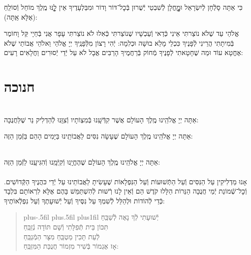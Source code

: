 \documentclass[twoside, openany, parskip=half, 11pt]{book}
\begin{document}
\begin{sometimes}
כִּי אַתָּה סָלְֿחָן לְֿיִשְׂרָאֵל וּמׇׇׇׇׇׇׇׇָחֳלָן לְֿשִׁבְטֵי יְֿשֻׁרוּן בְּֿכׇל־דּוֹר וָדוֹר
וּמִבַּלְעָדֶיךָ אֵין לׇׇׇׇָֽנּוּ מֶֽלֶךְ מוֹחֵל וְֿסוֹלֵֽחַ (אֶלָּא אַֽתָּה):

אֱלֹהַי עַד שֶׁלֹא נוֹצַרתִּי אֵינִי כְּֿדַאי וְֿעַכְשָׁיו שֶׁנוֹצַרתִּי כְּֿאִלוּ לֹא נוֹצַרתִּי עָפָר אֲנִי בְּֿחַיָי קַּל וָחוֹמֶר בְּֿמִיתָתִי הֲרֵינִי לְֿפָּנֶיךָ כִּכְלֵי מָלֵא בוּשָׁה וּכְלִמָה: יְֿהִי רָצוֹן מִלְּֿפָנֶֽיךָ יְיָ אֱלֹהַי וֵאלֹהֵי אֲבוֹתַי שֶׁלֹא אֶחֱטָא עוֹד וּמַה שֶׁחָטָאתִי לְֿפָנֶיךָ מְֿחוֹק בְּֿרַחֲמֶיךָ הָרַבִּים אֲבָל לֹא עַל יְֿדֵי יְֿסוּרִים וַחֲלָאִים רָעִים:

\vfill
\sepline

\chapter[חנוכה]{ חנוכה }
\label{chanukah}

\\
אַתָּה יְיָ אֱלֹהֵֽינוּ מֶֽלֶךְ הָעוֹלָם
אֲשֶׁר קִדְּֿשָֽׁנוּ בְּֿמִצְוֹתָיו וְֿצִוָּֽנוּ לְֿהַדְלִיק נֵר שֶׁלַּחֲנֻכָּה:

אַתָּה יְיָ אֱלֹהֵֽינוּ מֶֽלֶךְ הָעוֹלָם שֶׁעָשָׂה נִסִּים לַאֲבוֹתֵֽינוּ בַּיָּמִים הָהֵם בַּזְּֿמַן הַזֶּה:

\\
אַתָּה יְיָ אֱלֹהֵֽינוּ מֶֽלֶךְ הָעוֹלָם שֶׁהֶחֱיָֽנוּ וְֿקִיְּֿמָֽנוּ וְֿהִגִּיעָֽנוּ לַזְּֿמַן הַזֶּה:\\

\\
אָנוּ מַדְלִיקִין
עַל הַנִּסִּים וְֿעַל הַתְּֿשׁוּעוֹת
וְֿעַל הַנִּפְלָאוֹת
שֶׁעָשִׂיתָ לַאֲבוֹתֵינוּ
עַל יְֿדֵי כּהֲנֶיךָ הַקְּֿדוֹשִׁים.
וְֿכׇל־שְֿׁמוֹנַת יְֿמֵי חֲנֻכָּה
הַנֵּרוֹת הַלָּלוּ קֹדֶשׁ הֵם
וְֿאֵין לָנוּ רְֿשׁוּת לְֿהִשְׁתַּמֵּשׁ בָּהֶם
אֶלָּא לִרְאוֹתָם בִּלְבָד
כְּֿדֵי לְֿהוֹדוֹת וּלְהַלֵּל לְֿשִׁמְךָ
עַל נִסֶּיךָ וְֿעַל יְֿשׁוּעָתֶךָ
וְֿעַל נִפְלְֿאוֹתֶיךָ:

\begin{quote}
\leftskip=0pt plus-.5fil
\rightskip=0pt plus.5fil
\parfillskip=0pt plus1fil
יְֿשׁוּעָתִי \hfill לְֿךָ נָאֶה לְֿשַׁבֵּֽחַ \\ תִּכּוֹן בֵּית תְּֿפִלָּתִי \hfill וְֿשָׁם תּוֹדָה נְֿזַבֵּֽחַ \\
לְֿעֵת תָּכִין מַטְבֵּֽחַ \hfill מִצָּר הַמְֿנַבֵּֽחַ \\ אָז אֶגְמוֹר בְּֿשִׁיר מִזְמוֹר \hfill חֲנֻכַּת הַמִּזְבֵּֽחַ:


\end{quote}
\end{sometimes}
\end{document}
